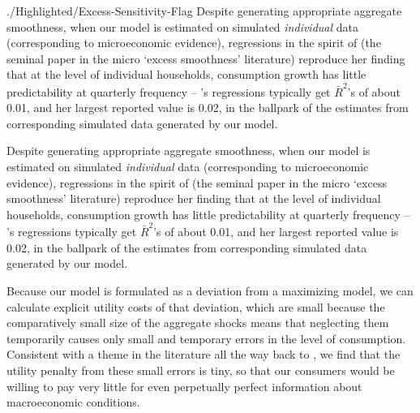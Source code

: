 \documentclass[titlepage]{./econtex}
\begin{document}
\begin{verbatimwrite}{./Highlighted/Excess-Sensitivity-Flag}
Despite generating appropriate aggregate smoothness, when our model is estimated on simulated \emph{individual} data (corresponding to microeconomic evidence), regressions in the spirit of  \cite{dynanHabits} (the seminal paper in the micro `excess smoothness' literature) reproduce her finding that at the level of individual households, consumption growth has little predictability at quarterly frequency -- \cite{dynanHabits}'s regressions typically get $\bar{R}^{2}$'s of about 0.01, and her largest reported value is 0.02, in the ballpark of the estimates from corresponding simulated data generated by our model.
\end{verbatimwrite}
Despite generating appropriate aggregate smoothness, when our model is estimated on simulated \emph{individual} data (corresponding to microeconomic evidence), regressions in the spirit of  \cite{dynanHabits} (the seminal paper in the micro `excess smoothness' literature) reproduce her finding that at the level of individual households, consumption growth has little predictability at quarterly frequency -- \cite{dynanHabits}'s regressions typically get $\bar{R}^{2}$'s of about 0.01, and her largest reported value is 0.02, in the ballpark of the estimates from corresponding simulated data generated by our model.
 
Because our model is formulated as a deviation from a maximizing model, we can calculate explicit utility costs of that deviation, which are small because the comparatively small size of the aggregate shocks means that neglecting them temporarily causes only small and temporary errors in the level of consumption.  Consistent with a theme in the literature all the way back to \cite{ayNearRational}, we find that the utility penalty from these small errors is tiny, so that our consumers would be willing to pay very little for even perpetually perfect information about macroeconomic conditions.
\end{document}
